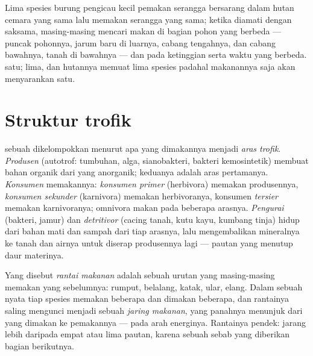 \begin{example}\label{ex:b1:ecosystem-organization:warblers}
Lima spesies burung pengicau kecil pemakan serangga bersarang dalam
hutan cemara yang sama lalu memakan serangga yang sama; ketika diamati
dengan saksama, masing-masing mencari makan di bagian pohon yang
berbeda --- puncak pohonnya, jarum baru di luarnya, cabang tengahnya,
 dan cabang bawahnya, tanah di bawahnya --- dan pada ketinggian
serta waktu yang berbeda.  satu;  lima, dan hutannya
memuat lima spesies padahal makanannya saja akan menyarankan satu.
\end{example}

\section{Struktur trofik}

\begin{definition}\label{def:b1:ecosystem-organization:trophic}
 sebuah  dikelompokkan menurut apa yang dimakannya
menjadi \emph{aras trofik}. \emph{Produsen} (autotrof: tumbuhan, alga,
sianobakteri, bakteri kemosintetik) membuat bahan organik dari yang
anorganik; keduanya adalah aras pertamanya. \emph{Konsumen}
memakannya: \emph{konsumen primer} (herbivora) memakan produsennya,
\emph{konsumen sekunder} (karnivora) memakan herbivoranya,
konsumen \emph{tersier} memakan karnivoranya; omnivora makan pada
beberapa arasnya. \emph{Pengurai} (bakteri, jamur) dan
\emph{detritivor} (cacing tanah, kutu kayu, kumbang tinja) hidup dari
bahan mati dan sampah dari tiap arasnya, lalu mengembalikan mineralnya
ke tanah dan airnya untuk diserap produsennya lagi --- pautan yang
menutup daur materinya.
\end{definition}

\begin{definition}\label{def:b1:ecosystem-organization:foodweb}
Yang disebut \emph{rantai makanan} adalah sebuah urutan  yang
masing-masing memakan yang sebelumnya: rumput, belalang, katak, ular,
elang. Dalam sebuah  nyata tiap spesies memakan beberapa dan
dimakan beberapa, dan rantainya saling mengunci menjadi sebuah
\emph{jaring makanan}, yang panahnya menunjuk dari yang dimakan ke
pemakannya --- pada arah energinya. Rantainya pendek: jarang lebih
daripada empat atau lima pautan, karena sebuah sebab yang diberikan
bagian berikutnya.
\end{definition}

